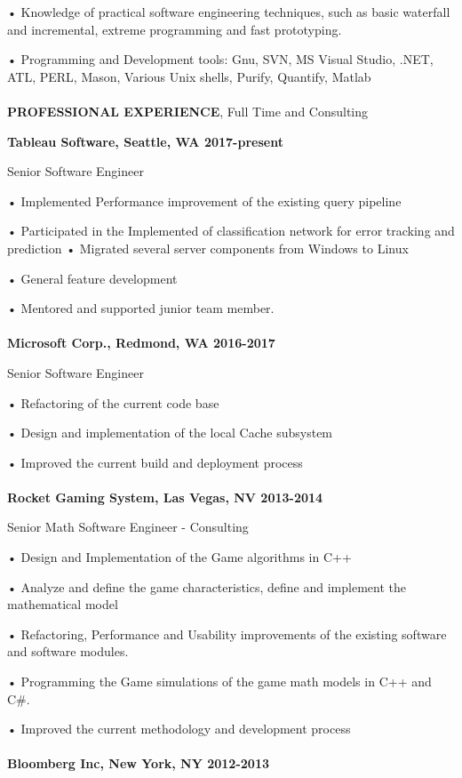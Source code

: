     • Knowledge of practical software engineering techniques, such as basic waterfall and incremental, extreme programming and fast prototyping.

    • Programming and Development tools: Gnu, SVN, MS Visual Studio, .NET, ATL, PERL, Mason, Various Unix shells, Purify, Quantify, Matlab
\\~\\
\textbf{PROFESSIONAL EXPERIENCE}, Full Time and Consulting

\textbf{Tableau Software, Seattle, WA						2017-present}

Senior Software Engineer 

    • Implemented Performance improvement of the existing query pipeline

    • Participated in the Implemented of classification network for error tracking and prediction
    • Migrated several server components from Windows to Linux

    • General feature development

    • Mentored and supported junior team member. 
\\~\\
\textbf{Microsoft Corp., Redmond, WA						2016-2017}

Senior Software Engineer 

    • Refactoring of the current code base

    • Design and implementation of the local Cache subsystem

    • Improved the current build and deployment process
\\~\\
\textbf{Rocket Gaming System, Las Vegas, NV						2013-2014}

Senior Math Software Engineer - Consulting

    • Design and Implementation of the Game algorithms in C++

    • Analyze and define the game characteristics, define and implement the  mathematical model

    • Refactoring, Performance and Usability improvements of the existing software and software modules.

    • Programming the Game simulations of the game math models in C++ and C\#.

    • Improved the current methodology and development process
\\~\\
\textbf{Bloomberg Inc, New York, NY							    2012-2013}

